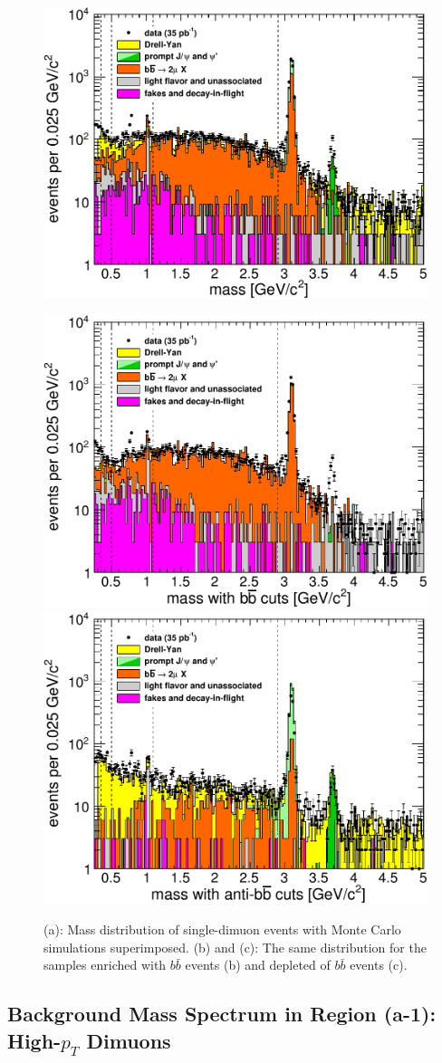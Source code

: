 \begin{figure}
\begin{center}
\includegraphics[width=0.45\linewidth]{PLOTS/support_mass_all_logy.pdf}

\includegraphics[width=0.45\linewidth]{PLOTS/support_mass_bbbar_logy.pdf}
\includegraphics[width=0.45\linewidth]{PLOTS/support_mass_antibbbar_logy.pdf}
\end{center}

\caption{ (a): Mass distribution of single-dimuon events with Monte Carlo
  simulations superimposed. (b) and (c): The same distribution for the samples 
enriched with $b\bar{b}$ events (b) and depleted of $b\bar{b}$ events (c). \label{fig:support_mass}}
\end{figure}

\subsection{Background Mass Spectrum in Region (a-1): High-$p_T$ Dimuons}


